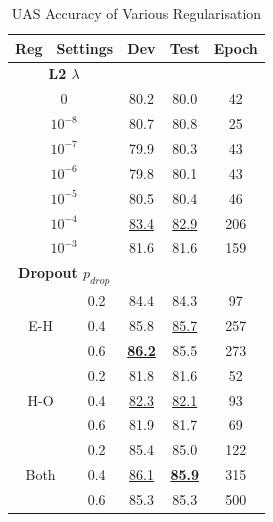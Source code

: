 \begin{table}[t]
\centering
\begin{tabular}{|c|c|c|c|c|}
\hline
\multicolumn{2}{|c|}{{\bf Reg　Settings}} & {\bf Dev } & {\bf Test } & {\bf Epoch} \\ \hline \hline
\multicolumn{2}{|c|}{{\bf L2 $\lambda$}}    &               &                &             \\ \hline
\multicolumn{2}{|c|}{0}                  & 80.2         & 80.0           & 42          \\ \hline
\multicolumn{2}{|c|}{$10^{-8}$}                  & 80.7          & 80.8          & 25          \\ \hline
\multicolumn{2}{|c|}{$10^{-7}$}                  & 79.9          & 80.3           & 43          \\ \hline
\multicolumn{2}{|c|}{$10^{-6}$}                  & 79.8          & 80.1           & 43         \\ \hline
\multicolumn{2}{|c|}{$10^{-5}$}                  & 80.5          & 80.4          & 46          \\ \hline
\multicolumn{2}{|c|}{$10^{-4}$}                  & {\underline{83.4}}          & {\underline{82.9}}           & 206          \\ \hline
\multicolumn{2}{|c|}{$10^{-3}$}                  & 81.6          & 81.6           & 159          \\ \hline \hline
\multicolumn{2}{|c|}{\bf Dropout $p_{drop}$}  &               &                &             \\ \hline
\multirow{3}{*}{E-H}      & 0.2          & 84.4          & 84.3          & 97          \\ \cline{2-5} 
                          & 0.4          & 85.8          & {\underline{85.7}}           & 257          \\ \cline{2-5} 
                          & 0.6          & {\underline{\bf 86.2}}         & 85.5           & 273          \\ \hline
\multirow{3}{*}{H-O}      & 0.2          & 81.8          & 81.6          & 52          \\ \cline{2-5} 
                          & 0.4          & {\underline{82.3}}          & {\underline{82.1}}          & 93          \\ \cline{2-5} 
                          & 0.6          & 81.9          & 81.7          & 69          \\ \hline
\multirow{3}{*}{Both}  & 0.2          & 85.4          & 85.0          & 122          \\ \cline{2-5} 
                          & 0.4          & {\underline{86.1}}         & {\underline{\bf 85.9}}           & 315          \\ \cline{2-5} 
                          & 0.6          & 85.3          & 85.3           & 500          \\ \hline
\end{tabular}
\caption{UAS Accuracy of Various Regularisation}
\label{tab_regul}
\end{table}

